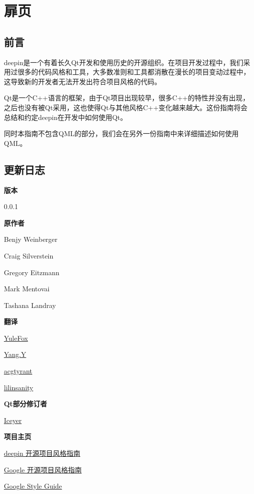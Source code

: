 \chapter{扉页}

\section{前言}

deepin是一个有着长久Qt开发和使用历史的开源组织。在项目开发过程中，我们采用过很多的代码风格和工具，大多数准则和工具都消散在漫长的项目变动过程中，这导致新的开发者无法开发出符合项目风格的代码。

Qt是一个C++语言的框架，由于Qt项目出现较早，很多C++的特性并没有出现，之后也没有被Qt采用，这也使得Qt与其他风格C++变化越来越大。这份指南将会总结和约定deepin在开发中如何使用Qt。

同时本指南不包含QML的部分，我们会在另外一份指南中来详细描述如何使用QML。

\section{更新日志}

\textbf{版本}

0.0.1

\textbf{原作者}

Benjy Weinberger

Craig Silverstein

Gregory Eitzmann

Mark Mentovai

Tashana Landray

\textbf{翻译}

\href{http://www.yulefox.com}{YuleFox}

\href{https://github.com/yangyubo}{Yang.Y}

\href{http://acgtyrant.com}{acgtyrant}

\href{http://github.com/lilinsanity}{lilinsanity}

\textbf{Qt部分修订者}

\href{https://blog.iceyer.net}{Iceyer}

\textbf{项目主页}

\href{https://gitlab.deepin.org/styleguide}{deepin 开源项目风格指南}

\href{https://github.com/zh-google-styleguide/zh-google-styleguide}{Google 开源项目风格指南}

\href{https://github.com/google/styleguide}{Google Style Guide}


